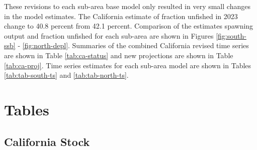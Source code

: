 \documentclass[
  letterpaper,
]{article}
\begin{document}
These revisions to each sub-area base model only resulted in very small changes in the model estimates. The California estimate of fraction unfished in 2023 change to 40.8 percent from 42.1 percent. Comparison of the estimates spawning output and fraction unfished for each sub-area are shown in Figures \ref{fig:south-ssb} - \ref{fig:north-depl}. Summaries of the combined California revised time series are shown in Table \ref{tab:ca-status} and new projections are shown in Table \ref{tab:ca-proj}. Time series estimates for each sub-area model are shown in Tables \ref{tab:tab-south-ts} and \ref{tab:tab-north-ts}.

\hypertarget{tables}{%
\section{Tables}\label{tables}}

\hypertarget{california-stock}{%
\subsection{California Stock}\label{california-stock}}

\begingroup\fontsize{10}{12}\selectfont
\begingroup\fontsize{10}{12}\selectfont
\end{document}
